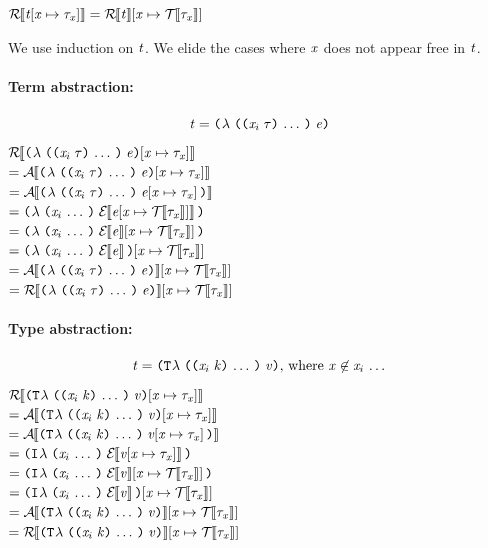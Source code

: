 \begin{lemma}%
  \label{TESubstErase}
  $\mathcal{R}{\hskip-.25em}\left\llbracket \mathit{t}\hspace{-2pt}\left[ \mathit{x} \mapsto \mathit{\tau}_{\mathit{x}} \right] \right\rrbracket = \mathcal{R}{\hskip-.25em}\left\llbracket \mathit{t} \right\rrbracket\hspace{-2pt}\left[ \mathit{x} \mapsto \mathcal{T}{\hskip-.25em}\left\llbracket \mathit{\tau}_{\mathit{x}} \right\rrbracket \right]$
\end{lemma}
\begin{sproof}
  We use induction on $\mathit{t}$.
  We elide the cases where $\mathit{x}$ does not appear free in $\mathit{t}$.

  \paragraph{Term abstraction:}
  \[\term = \lam{\sequence{\notevar{\var_i}{\type}}}{\expr}\]
  $\EraseTrm{\typesubst{\lam{\sequence{\notevar{\var_i}{\type}}}{\expr}}}$ \\
  $= \EraseA{\typesubst{\lam{\sequence{\notevar{\var_i}{\type}}}{\expr}}}$ \\
  $= \EraseA{\lam{\sequence{\notevar{\var_i}{\type}}}{\typesubst{\expr}}}$ \\
  $= \lam{\sequence{\var_i}}{\EraseE{\etypesubst{\expr}}}$ \\
  $= \lam{\sequence{\var_i}}{\etypesubst{\EraseE{\expr}}}$ \\
  $= \etypesubst{\lam{\sequence{\var_i}}{\EraseE{\expr}}}$ \\
  $= \etypesubst{\EraseA{\lam{\sequence{\notevar{\var_i}{\type}}}{\expr}}}$ \\
  $= \etypesubst{\EraseTrm{\lam{\sequence{\notevar{\var_i}{\type}}}{\expr}}}$ \\

  \paragraph{Type abstraction:}
  \[\term = \tlam{\sequence{\notevar{\var_i}{\kind}}}{\val}\text{, where } \var \not\in \sequence{\var_i}\]
  $\EraseTrm{\typesubst{\tlam{\sequence{\notevar{\var_i}{\kind}}}{\val}}}$ \\
  $= \EraseA{\typesubst{\tlam{\sequence{\notevar{\var_i}{\kind}}}{\val}}}$ \\
  $= \EraseA{\tlam{\sequence{\notevar{\var_i}{\kind}}}{\typesubst{\val}}}$ \\
  $= \ilam{\sequence{\var_i}}{\EraseE{\typesubst{\val}}}$ \\
  $= \ilam{\sequence{\var_i}}{\etypesubst{\EraseE{\val}}}$ \\
  $= \etypesubst{\ilam{\sequence{\var_i}}{\EraseE{\val}}}$ \\
  $= \etypesubst{\EraseA{\tlam{\sequence{\notevar{\var_i}{\kind}}}{\val}}}$ \\
  $= \etypesubst{\EraseTrm{\tlam{\sequence{\notevar{\var_i}{\kind}}}{\val}}}$ \\


\end{sproof}

